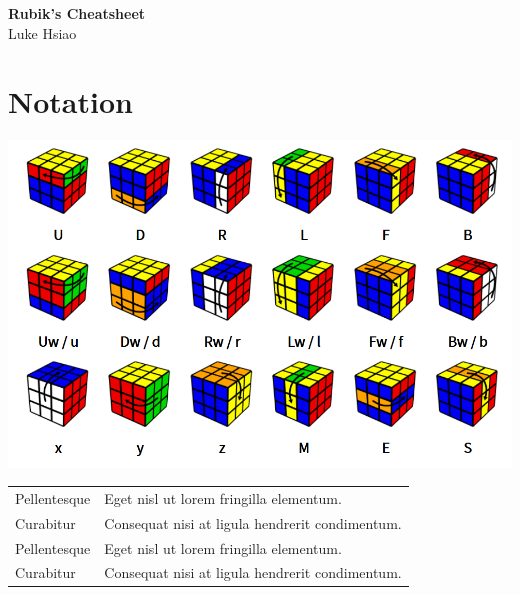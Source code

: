 \documentclass[10pt,landscape]{cheatsheet}
\begin{document}
\footnotesize
\begin{multicols}{3}

\begin{center}
     \Large{\textbf{Rubik's Cheatsheet}} \\
     Luke Hsiao
\end{center}

\section{Notation}
\begin{Figure}
    \centering
    \includegraphics[width=\linewidth]{img/notation.png}
    \label{fig:notation}
\end{Figure}

\lipsum[1]

\newcommand{\mitem}[2]{#1 & #2 \\}
\begin{tabular}{@{}ll@{}}
    \mitem{Pellentesque}{Eget nisl ut lorem fringilla elementum.}
    \mitem{Curabitur}{Consequat nisi at ligula hendrerit condimentum.}
    \hline
    \mitem{Pellentesque}{Eget nisl ut lorem fringilla elementum.}
    \mitem{Curabitur}{Consequat nisi at ligula hendrerit condimentum.}
\end{tabular}

\end{multicols}
\end{document}
